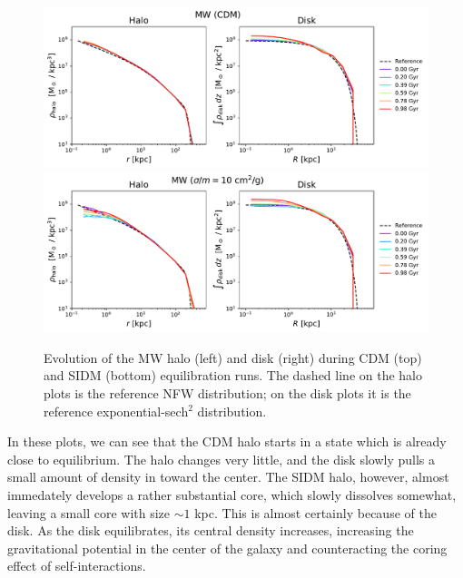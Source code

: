 \begin{figure}
    \centering
    \includegraphics[width=0.9\linewidth]{figs/mw_evolution_cdm.pdf}
    \includegraphics[width=0.9\linewidth]{figs/mw_evolution_sidm.pdf}
    \caption{%
        Evolution of the MW halo (left) and disk (right) during CDM (top) and
        SIDM (bottom) equilibration runs. The dashed line on the halo plots is
        the reference NFW distribution; on the disk plots it is the reference
        exponential-sech$^2$ distribution.
    }
    \label{fig:mw_evo}
\end{figure}

In these plots, we can see that the CDM halo starts in a state which is already
close to equilibrium. The halo changes very little, and the disk slowly pulls
a small amount of density in toward the center. The SIDM halo, however, almost
immedately develops a rather substantial core, which slowly dissolves somewhat,
leaving a small core with size $\sim 1$ kpc. This is almost certainly because
of the disk. As the disk equilibrates, its central density increases,
increasing the gravitational potential in the center of the galaxy and
counteracting the coring effect of self-interactions.


